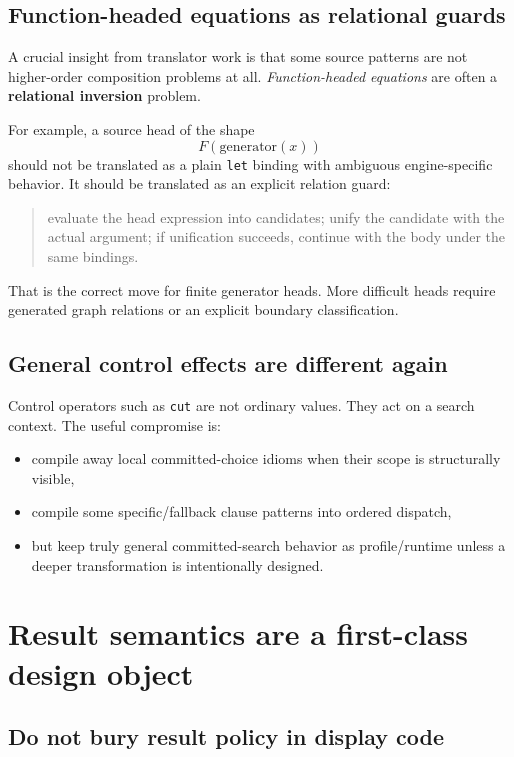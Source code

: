 \documentclass[11pt]{article}
\begin{document}
\subsection{Function-headed equations as relational guards}

A crucial insight from translator work is that some source patterns are not higher-order composition problems at all. \emph{Function-headed equations} are often a \textbf{relational inversion} problem.

For example, a source head of the shape
\[
F(\mathrm{generator}(x))
\]
should not be translated as a plain \texttt{let} binding with ambiguous engine-specific behavior. It should be translated as an explicit relation guard:

\begin{quote}
evaluate the head expression into candidates; unify the candidate with the actual argument; if unification succeeds, continue with the body under the same bindings.
\end{quote}

That is the correct move for finite generator heads. More difficult heads require generated graph relations or an explicit boundary classification.

\subsection{General control effects are different again}

Control operators such as \texttt{cut} are not ordinary values. They act on a search context. The useful compromise is:
\begin{itemize}
    \item compile away local committed-choice idioms when their scope is structurally visible,
    \item compile some specific/fallback clause patterns into ordered dispatch,
    \item but keep truly general committed-search behavior as profile/runtime unless a deeper transformation is intentionally designed.
\end{itemize}

\section{Result semantics are a first-class design object}

\subsection{Do not bury result policy in display code}
\end{document}
